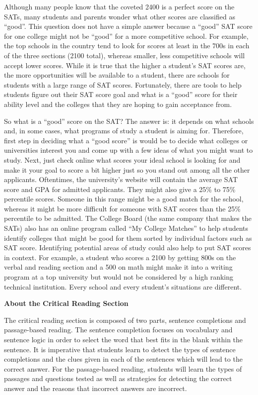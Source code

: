 \bigskip
Although many people know that the coveted 2400 is a perfect score on the SATs, many students and parents wonder what other scores are classified as ``good''. This question does not have a simple answer because a ``good'' SAT score for one college might not be ``good'' for a more competitive school. For example, the top schools in the country tend to look for scores at least in the 700s in each of the three sections (2100 total), whereas smaller, less competitive schools will accept lower scores. While it is true that the higher a student's SAT scores are, the more opportunities will be available to a student, there are schools for students with a large range of SAT scores. Fortunately, there are tools to help students figure out their SAT score goal and what is a ``good'' score for their ability level and the colleges that they are hoping to gain acceptance from.

\bigskip
So what is a “good” score on the SAT? The answer is: it depends on what schools and, in some cases, what programs of study a student is aiming for. Therefore, first step in deciding what a “good score” is would be to decide what colleges or universities interest you and come up with a few ideas of what you might want to study. Next, just check online what scores your ideal school is looking for and make it your goal to score a bit higher just so you stand out among all the other applicants. Oftentimes, the university's website will contain the average SAT score and GPA for admitted applicants. They might also give a 25\% to 75\% percentile scores. Someone in this range might be a good match for the school, whereas it might be more difficult for someone with SAT scores than the 25\% percentile to be admitted. The College Board (the same company that makes the SATs) also has an online program called ``My College Matches'' to help students identify colleges that might be good for them sorted by individual factors such as SAT score. Identifying potential areas of study could also help to put SAT scores in context. For example, a student who scores a 2100 by getting 800s on the verbal and reading section and a 500 on math might make it into a writing program at a top university but would not be considered by a high ranking technical institution. Every school and every student's situations are different.

\newpage
\textbf{\large About the Critical Reading Section}

The critical reading section is composed of two parts, sentence completions and passage-based reading. The sentence completion focuses on vocabulary and sentence logic in order to select the word that best fits in the blank within the sentence. It is imperative that students learn to detect the types of sentence completions and the clues given in each of the sentences which will lead to the correct answer. For the passage-based reading, students will learn the types of passages and questions tested as well as strategies for detecting the correct answer and the reasons that incorrect answers are incorrect.

